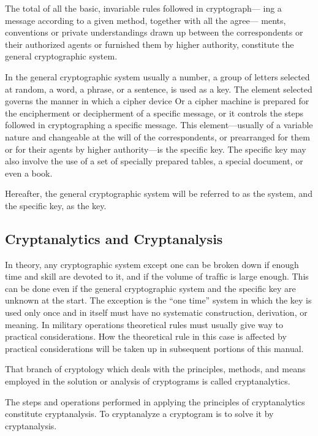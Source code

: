 \mypara The total of all the basic, invariable rules followed in cryptograph—
ing a message according to a given method, together with all the agree—
ments, conventions or private understandings drawn up between the
correspondents or their authorized agents or furnished them by higher
authority, constitute the general cryptographic system.

\mypara In the general cryptographic system usually a number, a group of
letters selected at random, a word, a phrase, or a sentence, is used as a
key. The element selected governs the manner in which a cipher device
Or a cipher machine is prepared for the encipherment or decipherment
of a speciﬁc message, or it controls the steps followed in cryptographing
a specific message. This element—usually of a variable nature and
changeable at the will of the correspondents, or prearranged for them or
for their agents by higher authority—is the speciﬁc key. The speciﬁc key
may also involve the use of a set of specially prepared tables, a special
document, or even a book.

\mypara Hereafter, the general cryptographic system will be referred to as
the system, and the speciﬁc key, as the key.

\subsection{Cryptanalytics and Cryptanalysis}

\mypara In theory, any cryptographic system except one can be broken down
if enough time and skill are devoted to it, and if the volume of trafﬁc is
large enough. This can be done even if the general cryptographic system
and the speciﬁc key are unknown at the start. The exception is the “one
time” system in which the key is used only once and in itself must have
no systematic construction, derivation, or meaning. In military operations
theoretical rules must usually give way to practical considerations. How
the theoretical rule in this case is affected by practical considerations
will be taken up in subsequent portions of this manual.

\mypara That branch of cryptology which deals with the principles, methods,
and means employed in the solution or analysis of cryptograms is called
cryptanalytics.

\mypara The steps and operations performed in applying the principles of
cryptanalytics constitute cryptanalysis. To cryptanalyze a cryptogram is
to solve it by cryptanalysis.

